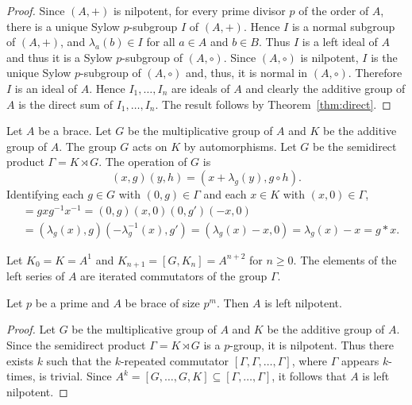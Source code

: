 \begin{proof}
Since $(A,+)$ is nilpotent, for every prime divisor $p$ of the order
of $A$, there is a unique Sylow $p$-subgroup $I$ of $(A,+)$. Hence $I$
is a normal subgroup of $(A,+)$, and $\lambda_a(b)\in I$ for all
$a\in A$ and $b\in B$. Thus $I$ is a left ideal of $A$ and thus it
is a Sylow $p$-subgroup of $(A,\circ)$. Since $(A,\circ)$ is
nilpotent, $I$ is the unique Sylow $p$-subgroup of $(A,\circ)$ and,
thus, it is normal in $(A,\circ)$. Therefore $I$ is an ideal of $A$.
Hence $I_1,\dots ,I_n$ are ideals of $A$ and clearly the additive
group of $A$ is the direct sum of $I_1,\dots ,I_n$. The result
follows by Theorem~\ref{thm:direct}.
\end{proof}


Let $A$ be a brace.  Let $G$ be the multiplicative group
of $A$ and $K$ be the additive group of $A$. The group $G$ acts on
$K$ by automorphisms. Let $G$ be the semidirect product
$\Gamma=K\rtimes G$. The operation of $G$ is 
\[
    (x,g)(y,h)=(x+\lambda_g(y),g\circ h).
\]
Identifying each $g\in G$ with $(0,g)\in\Gamma$ and each $x\in K$
with $(x,0)\in\Gamma$, 
\begin{align*}
[g,x]&= gxg^{-1}x^{-1}=(0,g)(x,0)(0,g')(-x,0)\\
&=(\lambda_g(x),g)(-\lambda^{-1}_g(x),g')
=(\lambda_g(x)-x,0)=\lambda_g(x)-x=g*x.
\end{align*}

Let $K_0=K=A^1$ and $K_{n+1}=[G,K_n]=A^{n+2}$ for $n\geq0$. 
The elements of the left series of $A$ are iterated commutators of
the group $\Gamma$.  

\begin{proposition}
    \label{pro:pgroups}
    Let $p$ be a prime and $A$ be brace of size $p^m$. Then $A$ is
    left nilpotent.
\end{proposition}

\begin{proof}
    Let $G$ be the multiplicative group of $A$ and $K$ be the additive group of
    $A$. Since the semidirect product $\Gamma=K\rtimes G$ is a $p$-group, it is
    nilpotent. Thus there exists $k$ such that the $k$-repeated commutator
    $[\Gamma,\Gamma,\dots,\Gamma]$, where $\Gamma$ appears $k$-times, is trivial. Since
    $A^k=[G,\dots,G,K]\subseteq [\Gamma,\dots,\Gamma]$, 
    it follows that $A$ is left nilpotent.
\end{proof}

